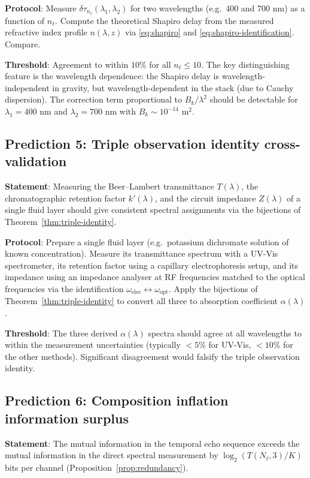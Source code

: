 \documentclass[11pt,twocolumn,a4paper]{article}
\theoremstyle{plain}
\theoremstyle{definition}
\theoremstyle{remark}
\begin{document}
\textbf{Protocol}: Measure $\delta\tau_{n_\ell}(\lambda_1,\lambda_2)$ for two wavelengths (e.g.\ 400 and 700 nm) as a function of $n_\ell$. Compute the theoretical Shapiro delay from the measured refractive index profile $n(\lambda,z)$ via \eqref{eq:shapiro} and \eqref{eq:shapiro-identification}. Compare.

\textbf{Threshold}: Agreement to within $10\%$ for all $n_\ell\leq 10$. The key distinguishing feature is the wavelength dependence: the Shapiro delay is wavelength-independent in gravity, but wavelength-dependent in the stack (due to Cauchy dispersion). The correction term proportional to $B_k/\lambda^2$ should be detectable for $\lambda_1=400$ nm and $\lambda_2=700$ nm with $B_k\sim 10^{-14}$ m$^2$.

\subsection{Prediction 5: Triple observation identity cross-validation}

\textbf{Statement}: Measuring the Beer--Lambert transmittance $T(\lambda)$, the chromatographic retention factor $k'(\lambda)$, and the circuit impedance $Z(\lambda)$ of a single fluid layer should give consistent spectral assignments via the bijections of Theorem~\ref{thm:triple-identity}.

\textbf{Protocol}: Prepare a single fluid layer (e.g.\ potassium dichromate solution of known concentration). Measure its transmittance spectrum with a UV-Vis spectrometer, its retention factor using a capillary electrophoresis setup, and its impedance using an impedance analyser at RF frequencies matched to the optical frequencies via the identification $\omega_\text{elec}\leftrightarrow\omega_\text{opt}$. Apply the bijections of Theorem~\ref{thm:triple-identity} to convert all three to absorption coefficient $\alpha(\lambda)$.

\textbf{Threshold}: The three derived $\alpha(\lambda)$ spectra should agree at all wavelengths to within the measurement uncertainties (typically $<5\%$ for UV-Vis, $<10\%$ for the other methods). Significant disagreement would falsify the triple observation identity.

\subsection{Prediction 6: Composition inflation information surplus}

\textbf{Statement}: The mutual information in the temporal echo sequence exceeds the mutual information in the direct spectral measurement by $\log_2(T(N_\ell,3)/K)$ bits per channel (Proposition~\ref{prop:redundancy}).
\end{document}
